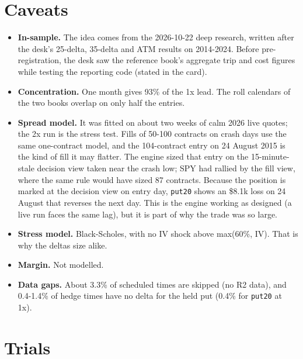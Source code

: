 \documentclass{article}
\begin{document}
\section{Caveats}

\begin{itemize}

\item \textbf{In-sample.} The idea comes from the 2026-10-22 deep research, written after the desk's 25-delta, 35-delta and ATM results on 2014-2024. Before pre-registration, the desk saw the reference book's aggregate trip and cost figures while testing the reporting code (stated in the card).

\item \textbf{Concentration.} One month gives 93\% of the 1x lead. The roll calendars of the two books overlap on only half the entries.

\item \textbf{Spread model.} It was fitted on about two weeks of calm 2026 live quotes; the 2x run is the stress test. Fills of 50-100 contracts on crash days use the same one-contract model, and the 104-contract entry on 24 August 2015 is the kind of fill it may flatter. The engine sized that entry on the 15-minute-stale decision view taken near the crash low; SPY had rallied by the fill view, where the same rule would have sized 87 contracts. Because the position is marked at the decision view on entry day, \texttt{put20} shows an \$8.1k loss on 24 August that reverses the next day. This is the engine working as designed (a live run faces the same lag), but it is part of why the trade was so large.

\item \textbf{Stress model.} Black-Scholes, with no IV shock above max(60\%, IV). That is why the deltas size alike.

\item \textbf{Margin.} Not modelled.

\item \textbf{Data gaps.} About 3.3\% of scheduled times are skipped (no R2 data), and 0.4-1.4\% of hedge times have no delta for the held put (0.4\% for \texttt{put20} at 1x).

\end{itemize}

\section{Trials}
\end{document}
